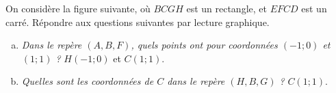 \documentclass[12pt]{article}
\begin{document}
\begin{exercice}
On considère la figure suivante, où $BCGH$ est un rectangle, et $EFCD$ est un carré. Répondre aux questions suivantes par lecture graphique.

\begin{multicols}{2}

\begin{center}
\end{center}


\begin{enumerate}[(a)]
  \item \emph{Dans le repère $(A, B, F)$, quels points ont pour coordonnées $(-1;0)$ et $(1; 1)$ ?} $H(-1;0)$ et $C(1;1)$.
  \item \emph{Quelles sont les coordonnées de $C$ dans le repère $(H, B, G)$ ?} $C(1;1)$.
\end{enumerate}
\end{multicols}

\end{exercice}
\end{document}
